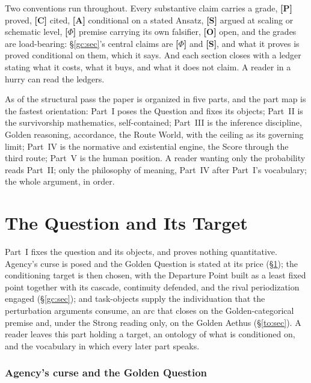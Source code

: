 \documentclass[11pt]{article}
\numberwithin{equation}{section}
\theoremstyle{plain}
\theoremstyle{definition}
\theoremstyle{remark}
\begin{document}
Two conventions run throughout. Every substantive claim carries a grade, \textbf{[P]} proved, \textbf{[C]} cited, \textbf{[A]} conditional on a
stated Ansatz, \textbf{[S]} argued at scaling or schematic level,
\textbf{[$\Phi$]} premise carrying its own falsifier, \textbf{[O]} open, and the grades are load-bearing:
\S\ref{gc:sec}'s central claims are \textbf{[$\Phi$]} and \textbf{[S]},
and what it proves is proved conditional on them, which it says. And each
section closes with a ledger stating what it costs, what it buys, and
what it does not claim. A reader in a hurry can read the ledgers.

As of the structural pass the paper is organized in five parts, and
the part map is the fastest orientation: Part~I poses the Question
and fixes its objects; Part~II is the survivorship mathematics,
self-contained; Part~III is the inference discipline, Golden
reasoning, accordance, the Route World, with the ceiling as its
governing limit; Part~IV is the normative and existential engine,
the Score through the third route; Part~V is the human position.
A reader wanting only the probability reads Part~II; only the
philosophy of meaning, Part~IV after Part~I's vocabulary; the
whole argument, in order.

\part{The Question and Its Target}

\noindent Part~I fixes the question and its objects, and proves
nothing quantitative. Agency's curse is posed and the Golden Question
is stated at its price (\S\ref{ac:sec}); the conditioning target is
then chosen, with the Departure Point built as a least fixed point
together with its cascade, continuity defended, and the rival
periodization engaged (\S\ref{gc:sec}); and task-objects supply the
individuation that the perturbation arguments consume, an arc that
closes on the Golden-categorical premise and, under the Strong
reading only, on the Golden Aethus (\S\ref{to:sec}). A reader leaves
this part holding a target, an ontology of what is conditioned on,
and the vocabulary in which every later part speaks.

\section{Agency's curse and the Golden Question}\label{ac:sec}
\end{document}

